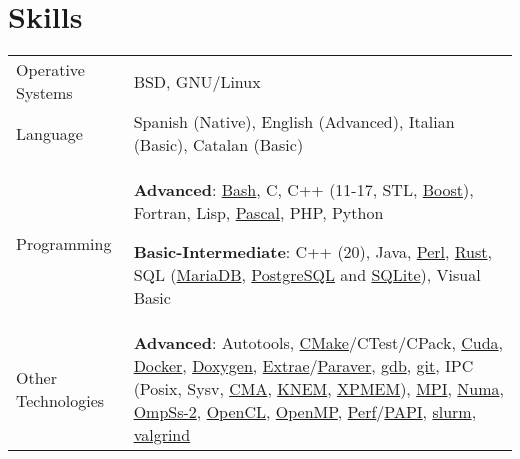 \documentclass[a4paper,11pt]{article}
\begin{document}
\section{Skills}
\begin{tabularx}{\linewidth}{@{}l X@{}}
  Operative Systems & BSD, GNU/Linux \\
  Language & Spanish (Native), English (Advanced), Italian (Basic), Catalan (Basic)\\
  Programming & \textbf{Advanced}: \href{https://www.gnu.org/software/bash/}{Bash},
                C, C++ (11-17, STL, \href{https://www.boost.org/}{Boost}), Fortran, Lisp,
                \href{https://www.freepascal.org/}{Pascal}, PHP, Python

                \textbf{Basic-Intermediate}: C++ (20), Java,
                \href{https://www.perl.org/}{Perl},
                \href{https://www.rust-lang.org/}{Rust},
                SQL (\href{https://mariadb.org/}{MariaDB},
                \href{https://www.postgresql.org/}{PostgreSQL} and
                \href{https://www.sqlite.org/index.html}{SQLite}), Visual Basic  \\

  Other Technologies & \textbf{Advanced}:
                       Autotools,
                       \href{https://cmake.org/}{CMake}/CTest/CPack,
                       \href{https://developer.nvidia.com/cuda-zone}{Cuda},
                       \href{https://www.docker.com/}{Docker},
                       \href{https://doxygen.nl/}{Doxygen},
                       \href{https://tools.bsc.es/extrae}{Extrae}/\href{https://tools.bsc.es/paraver}{Paraver},
                       \href{https://www.sourceware.org/gdb/}{gdb},
                       \href{https://git-scm.com/}{git},
                       IPC (Posix, Sysv,
                       \href{https://lwn.net/Articles/405284/}{CMA},
                       \href{https://knem.gitlabpages.inria.fr/}{KNEM},
                       \href{https://github.com/hpc/xpmem}{XPMEM}),
                       \href{https://www.mpi-forum.org/}{MPI},
                       \href{https://www.kernel.org/doc/html/v4.19/vm/numa.html}{Numa},
                       \href{https://pm.bsc.es/ompss-2}{OmpSs-2},
                       \href{https://www.khronos.org/api/opencl}{OpenCL},
                       \href{https://www.openmp.org/}{OpenMP},
                       \href{https://perf.wiki.kernel.org/index.php/Main_Page}{Perf}/\href{https://icl.utk.edu/papi/}{PAPI},
                       \href{https://slurm.schedmd.com/}{slurm},
                       \href{https://valgrind.org/}{valgrind}


\end{tabularx}
\end{document}
